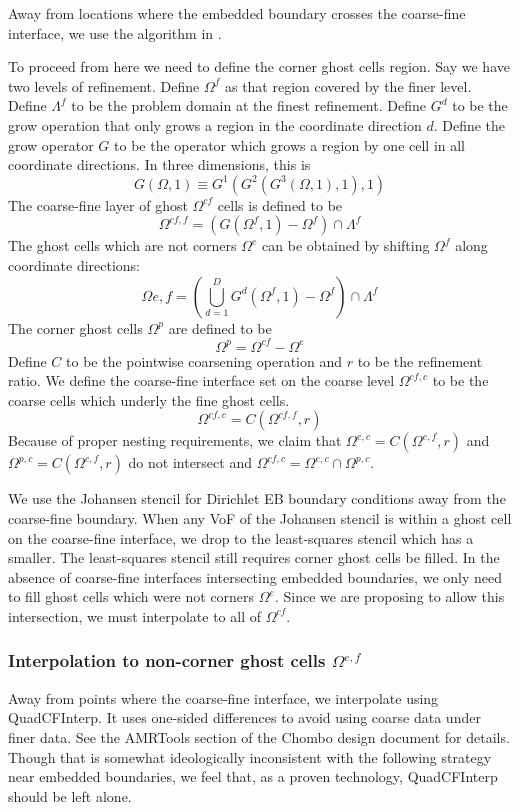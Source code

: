 Away from locations where the embedded boundary crosses the
coarse-fine interface, we use the algorithm in  \cite{ChomboDesign}.

To proceed from here we need to define the corner ghost cells region.
Say we have two levels of refinement.  Define $\Omega^f$ as that region covered by
the finer level. Define $\Lambda^f$ to be the problem domain at the
finest refinement.  Define $G^d$ to be the grow operation that only grows a region in the
coordinate direction $d$.  Define
the  grow operator $G$ to be the operator which grows a region by one
cell in all coordinate directions.  In three dimensions, this is
$$
 G(\Omega, 1)  \equiv G^1(G^2(G^3(\Omega,1), 1), 1)
$$
The coarse-fine layer of ghost 
$\Omega^{cf}$
cells is defined to be 
$$
\Omega^{cf,f} = (G(\Omega^f, 1) - \Omega^f) \cap \Lambda^f
$$
The ghost cells which are not corners $\Omega^e$ can be
obtained by shifting $\Omega^f$ along coordinate directions:
$$
\Omega{e,f} = (\bigcup\limits^{D}_{d = 1} G^d(\Omega^f, 1) - \Omega^f)
\cap \Lambda^f
$$
The corner ghost cells $\Omega^{p}$ are defined to be 
$$
\Omega^p = \Omega^{cf} - \Omega^e
$$
Define $C$ to be the pointwise coarsening operation and $r$ to be the
refinement ratio.  We define  the coarse-fine interface set on the
coarse level $\Omega^{cf,c}$ to be the coarse cells which underly the
fine ghost cells.
$$
\Omega^{cf, c} = C(\Omega^{cf,f}, r)
$$
Because of proper nesting requirements, we claim that
$ \Omega^{e, c} = C(\Omega^{e,f}, r) $ and 
$ \Omega^{p, c} = C(\Omega^{c,f}, r) $ do not intersect and 
$\Omega^{cf, c} =\Omega^{e,c} \cap \Omega^{p,c}$.

We use the Johansen stencil for Dirichlet EB boundary conditions
away from the coarse-fine boundary.  When any VoF of the Johansen
stencil is within a ghost cell on the coarse-fine interface, we drop
to the least-squares stencil which has a smaller.   The least-squares
stencil still requires corner ghost cells be filled.
In the absence of coarse-fine interfaces intersecting embedded
boundaries,  we only need to fill ghost cells which were not corners
$\Omega^e$.    Since we are proposing to allow this intersection, we
must interpolate to all of $\Omega^{cf}$.

\subsubsection{Interpolation to non-corner ghost cells $\Omega^{e,f}$}

Away from points where the  coarse-fine interface, we interpolate
using QuadCFInterp.   It uses one-sided differences to avoid using
coarse data under finer data.  See the AMRTools section of the Chombo
design document for details.   Though that is somewhat ideologically
inconsistent with the following strategy near embedded boundaries, we
feel that, as a proven technology, QuadCFInterp should be left alone.


